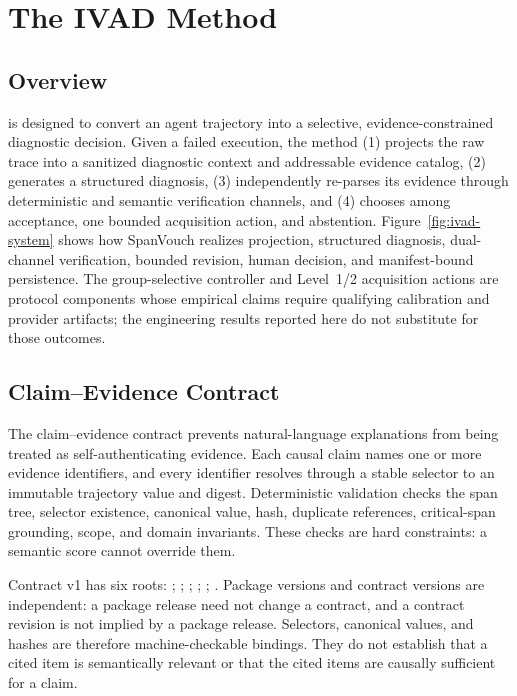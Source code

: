 \section{The IVAD Method}
\label{sec:method}

\subsection{Overview}

\method is designed to convert an agent trajectory into a selective,
evidence-constrained
diagnostic decision. Given a failed execution, the method (1) projects the raw
trace into a sanitized diagnostic context and addressable evidence catalog,
(2) generates a structured diagnosis, (3) independently re-parses its evidence
through deterministic and semantic verification channels, and (4) chooses
among acceptance, one bounded acquisition action, and abstention.
Figure~\ref{fig:ivad-system} shows how SpanVouch realizes projection,
structured diagnosis, dual-channel verification, bounded revision, human
decision, and manifest-bound persistence. The group-selective controller and
Level~1/2 acquisition actions are protocol components whose empirical claims
require qualifying calibration and provider artifacts; the engineering results
reported here do not substitute for those outcomes.

\subsection{Claim--Evidence Contract}

The claim--evidence contract prevents natural-language explanations from being
treated as self-authenticating evidence. Each causal claim names one or more
evidence identifiers, and every identifier resolves through a stable selector
to an immutable trajectory value and digest. Deterministic validation checks
the span tree, selector existence, canonical value, hash, duplicate references,
critical-span grounding, scope, and domain invariants. These checks are hard
constraints: a semantic score cannot override them.

Contract v1 has six roots:\newline
{\footnotesize{}; ;\newline
{};\newline
{}; ;\newline
{}.} Package versions and contract versions
are independent: a package release need not change a contract, and a contract
revision is not implied by a package release. Selectors, canonical values, and
hashes are therefore machine-checkable bindings. They do not establish that a
cited item is semantically relevant or that the cited items are causally
sufficient for a claim.

